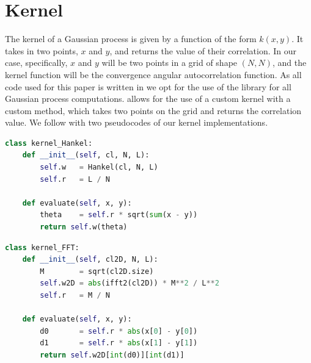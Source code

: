 \section{Kernel}
\label{sec:gaussian process kernel}
The kernel of a Gaussian process is given by a function of the form $k(x,y)$. It takes in two points, $x$ and $y$, and returns the value of their correlation. In our case, specifically, $x$ and $y$ will be two points in a grid of shape $(N,N)$, and the kernel function will be the convergence angular autocorrelation function. As all code used for this paper is written in  \cite{jax} we opt for the use of the library  \cite{tinygp} for all Gaussian process computations.  allows for the use of a custom kernel with a custom  method, which takes two points on the grid and returns the correlation value. We follow with two  pseudocodes of our kernel implementations.
\begin{lstlisting}[language=Python, label={lst:hankel}, caption=\code{kernel_Hankel} uses the helper function \code{Hankel} which returns a 1D callable correlation function \code{w}. Then finds the euclidean distance between $x$ and $y$ and evaluates the correlation function at that point. We will discuss how we perform the Hankel transformation in the following section.]
class kernel_Hankel:
    def __init__(self, cl, N, L):
        self.w   = Hankel(cl, N, L)
        self.r   = L / N
        
    def evaluate(self, x, y):
        theta    = self.r * sqrt(sum(x - y))
        return self.w(theta)
\end{lstlisting}
 
\begin{lstlisting}[language=Python, label={lst:FFT}, caption=\code{kernel_FFT} performs a 2D Fourier transform on the power spectrum \code{cl2D}. This returns a 2D array that is the correlation function. Then to evaluate \code{w2D} we need two indices. These are given by the difference of $x$ and $y$ component wise. Furthermore we have to be careful about possible mismatches between the shape of \code{cl2D} and the grid of our map. For this we have the renormalisation factor \code{r}. We will discuss further how we get \code{cl2D} in the following section.]
class kernel_FFT:
    def __init__(self, cl2D, N, L):
        M        = sqrt(cl2D.size)
        self.w2D = abs(ifft2(cl2D)) * M**2 / L**2
        self.r   = M / N
        
    def evaluate(self, x, y):
        d0       = self.r * abs(x[0] - y[0])
        d1       = self.r * abs(x[1] - y[1])
        return self.w2D[int(d0)][int(d1)]
\end{lstlisting}

